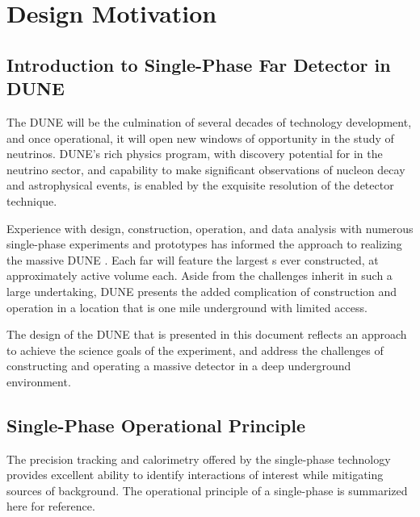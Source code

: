 \chapter{Design Motivation}
\label{ch:fdsp-apa-design}

\section{Introduction to Single-Phase Far Detector in DUNE}
\label{sec:fdsp-design-intro}

The DUNE  will be the culmination of several decades
of \lartpc technology development, and once operational, it will open new windows of opportunity in the study
of neutrinos.  DUNE's rich physics program, with discovery
potential for  in the neutrino sector, and capability to make
significant observations of nucleon decay and astrophysical events, is enabled
by the exquisite resolution of the \lartpc detector technique.

Experience with design, construction, operation, and data
analysis with numerous single-phase \lartpc experiments and prototypes has informed the approach to
realizing the massive DUNE . Each far  will feature the largest \lartpc{}s ever
constructed, at approximately \nominalmodsize active volume each.  Aside from the
challenges inherit in such a large undertaking, DUNE presents the added complication of construction and operation in a location
that is one mile underground with limited access.

The design of the DUNE  that is presented in this document
reflects an approach to achieve the science goals of the experiment, and
address the challenges of constructing and operating a massive detector in a deep
underground environment.


\section{Single-Phase \lartpc Operational Principle}
\label{sec:fdsp-design-op}

The precision tracking and calorimetry offered by the single-phase \lartpc
technology provides excellent ability to identify interactions of interest
while mitigating sources of background.  The operational principle of a
single-phase \lartpc is summarized here for reference.

